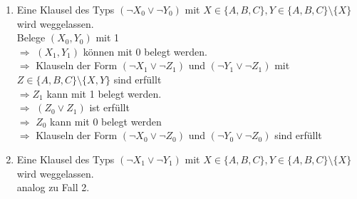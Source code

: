 \documentclass[a4paper,10pt]{article}
\begin{document}
\begin{enumerate}
\begin{enumerate}[1.]
\begin{enumerate}
				\item Eine Klausel des Typs $(\lnot X_0 \lor \lnot Y_0)$ mit $X \in \{A,B,C\}, Y \in \{A,B,C \}\setminus\{X\}$ wird weggelassen.\\
				Belege $(X_0, Y_0)$ mit 1 \\
				$\Rightarrow$ $(X_1, Y_1)$ können mit 0 belegt werden. \\
				$\Rightarrow$ Klauseln der Form $(\lnot X_1 \lor \lnot Z_1)$ und $(\lnot Y_1 \lor \lnot Z_1)$ mit $Z \in \{A,B,C\}\setminus\{X,Y\}$ sind erfüllt\\
				$\Rightarrow Z_1$ kann mit 1 belegt werden.\\
				$\Rightarrow$ $(Z_0 \lor Z_1)$ ist erfüllt\\
				$\Rightarrow$ $Z_0 $ kann mit 0 belegt werden \\
				$\Rightarrow$ Klauseln der Form $(\lnot X_0 \lor \lnot Z_0)$ und $(\lnot Y_0 \lor \lnot Z_0)$ sind erfüllt \\
				\item Eine Klausel des Typs $(\lnot X_1 \lor \lnot Y_1)$ mit $X \in \{A,B,C\}, Y \in \{A,B,C \}\setminus\{X\}$ wird weggelassen.\\
				analog zu Fall 2.


\end{enumerate}
\end{enumerate}
\end{enumerate}
\end{document}
